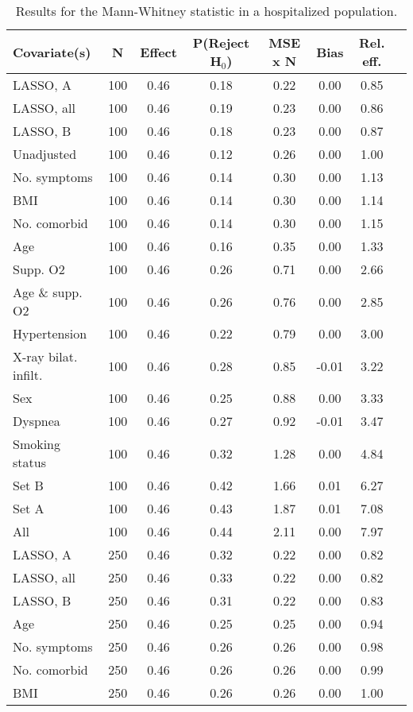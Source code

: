 \documentclass{article}
\begin{document}
{\tabcolsep=6pt  %
\begin{longtable}{lccccccc}
\caption{Results for the Mann-Whitney statistic in a hospitalized population.}\label{tab18}\\
Covariate(s) & N & Effect & P(Reject H$_0$) & MSE x N & Bias & Rel. eff.\\ \midrule
LASSO, A & 100 & 0.46 & 0.18 & 0.22 & 0.00 & 0.85\\
LASSO, all & 100 & 0.46 & 0.19 & 0.23 & 0.00 & 0.86\\
LASSO, B & 100 & 0.46 & 0.18 & 0.23 & 0.00 & 0.87\\
Unadjusted & 100 & 0.46 & 0.12 & 0.26 & 0.00 & 1.00\\
No. symptoms & 100 & 0.46 & 0.14 & 0.30 & 0.00 & 1.13\\
BMI & 100 & 0.46 & 0.14 & 0.30 & 0.00 & 1.14\\
No. comorbid & 100 & 0.46 & 0.14 & 0.30 & 0.00 & 1.15\\
Age & 100 & 0.46 & 0.16 & 0.35 & 0.00 & 1.33\\
Supp. O2 & 100 & 0.46 & 0.26 & 0.71 & 0.00 & 2.66\\
Age \& supp. O2 & 100 & 0.46 & 0.26 & 0.76 & 0.00 & 2.85\\
Hypertension & 100 & 0.46 & 0.22 & 0.79 & 0.00 & 3.00\\
X-ray bilat. infilt. & 100 & 0.46 & 0.28 & 0.85 & -0.01 & 3.22\\
Sex & 100 & 0.46 & 0.25 & 0.88 & 0.00 & 3.33\\
Dyspnea & 100 & 0.46 & 0.27 & 0.92 & -0.01 & 3.47\\
Smoking status & 100 & 0.46 & 0.32 & 1.28 & 0.00 & 4.84\\
Set B & 100 & 0.46 & 0.42 & 1.66 & 0.01 & 6.27\\
Set A & 100 & 0.46 & 0.43 & 1.87 & 0.01 & 7.08\\
All & 100 & 0.46 & 0.44 & 2.11 & 0.00 & 7.97\\ \midrule
LASSO, A & 250 & 0.46 & 0.32 & 0.22 & 0.00 & 0.82\\
LASSO, all & 250 & 0.46 & 0.33 & 0.22 & 0.00 & 0.82\\
LASSO, B & 250 & 0.46 & 0.31 & 0.22 & 0.00 & 0.83\\
Age & 250 & 0.46 & 0.25 & 0.25 & 0.00 & 0.94\\
No. symptoms & 250 & 0.46 & 0.26 & 0.26 & 0.00 & 0.98\\
No. comorbid & 250 & 0.46 & 0.26 & 0.26 & 0.00 & 0.99\\
BMI & 250 & 0.46 & 0.26 & 0.26 & 0.00 & 1.00\\

\end{longtable}}
\end{document}
